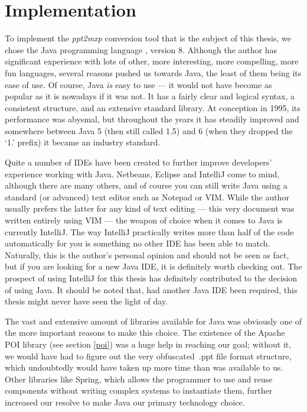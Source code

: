 
 \chapter{Implementation}
  \label{implementation}

  To implement the \emph{ppt2mxp} conversion tool that is the subject of this
  thesis, we chose the Java programming language \citep{gosling-1}, version 8.
  Although the author has significant experience with lots of other, more
  interesting, more compelling, more fun languages, several reasons pushed us
  towards Java, the least of them being its ease of use. Of course, Java
  \emph{is} easy to use --- it would not have become as popular as it is
  nowadays if it was not. It has a fairly clear and logical syntax, a consistent
  structure, and an extensive standard library. At conception in 1995, its
  performance was abysmal, but throughout the years it has steadily improved
  and somewhere between Java 5 (then still called 1.5) and 6 (when they dropped
  the `1.' prefix) it became an industry standard.

  Quite a number of IDEs have been created to further improve developers'
  experience working with Java. Netbeans, Eclipse and IntelliJ come to mind,
  although there are many others, and of course you can still write Java using
  a standard (or advanced) text editor such as Notepad or VIM. While the author
  usually prefers the latter for any kind of text editing --- this very
  document was written entirely using VIM --- the weapon of choice when it
  comes to Java is currently IntelliJ. The way IntelliJ practically writes more
  than half of the code automatically for you is something no other IDE has
  been able to match. Naturally, this is the author's personal opinion and
  should not be seen as fact, but if you are looking for a new Java IDE, it is
  definitely worth checking out. The prospect of using IntelliJ for this thesis
  has definitely contributed to the decision of using Java. It should be noted
  that, had another Java IDE been required, this thesis might never have seen
  the light of day.

  The vast and extensive amount of libraries available for Java was obviously
  one of the more important reasons to make this choice. The existence of the
  Apache POI library (see section \ref{poi}) was a huge help in reaching our
  goal; without it, we would have had to figure out the very obfuscated\ .ppt
  file format structure, which undoubtedly would have taken up more time than
  was available to us. Other libraries like Spring, which allows the programmer
  to use and reuse components without writing complex systems to instantiate
  them, further increased our resolve to make Java our primary technology
  choice.

